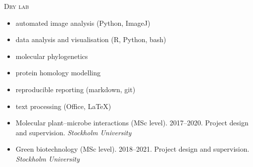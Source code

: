 \documentclass[11pt]{article}
\begin{document}
\textsc{\large{Dry lab}} 
\vspace{-0.175cm}
\begin{addmargin}[24pt]{0pt}
	\begin{multicols}{2}
		\raggedright
		\begin{itemize}[itemindent=-9pt,leftmargin=24pt]
			\itemsep-0.1cm
			\item automated image analysis (Python, ImageJ)
			\item data analysis and visualisation (R, Python, bash)
			\item molecular phylogenetics
			\item protein homology modelling
			\item reproducible reporting (markdown, git)
			\item text processing (Office, LaTeX)
		\end{itemize}
	\end{multicols}
\end{addmargin}
\vspace{0.5cm}


\vspace{-0.175cm}
\begin{itemize}[label={},itemindent=-9pt,leftmargin=24pt]
	\itemsep-0.1cm
	\item Molecular plant--microbe interactions (MSc level). 2017--2020. Project design and supervision. \textit{Stockholm University} 	
	\item Green biotechnology (MSc level). 2018--2021. Project design and supervision. \textit{Stockholm University} 
\end{itemize}
\vspace{0.3cm}
\end{document}
